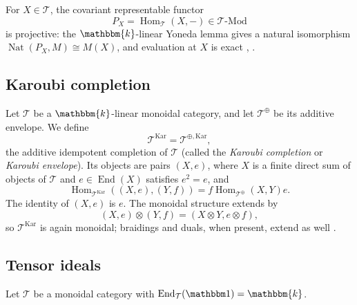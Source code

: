 \documentclass[11pt,a4paper]{amsart}
\theoremstyle{plain}%
\theoremstyle{definition}
\theoremstyle{remark}
\newcommand{\Hom}{\operatorname{Hom}}
\newcommand{\triv}{{\mathbbm 1}}
\newcommand{\End}{\operatorname{End}}
\newcommand{\kk}{\mathbbm{k}}
\newcommand{\Kar}{\mathrm{Kar}}
\begin{document}
For $X\in\mathcal{T}$, the covariant representable functor
\[
P_X=\Hom_{\mathcal{T}}(X,-)\in \mathcal{T}\text{-}\mathrm{Mod}
\]
is projective: the $\kk$-linear Yoneda lemma gives a natural isomorphism $\operatorname{Nat}(P_X,M)\cong M(X)$, and evaluation at $X$ is exact \cite[Chapters II, \S4 and III, \S2]{MacLane}, \cite[\S1.3.3--1.3.4]{Coulembier-ideals}.



\subsection{Karoubi completion}

Let $\mathcal{T}$ be a $\kk$-linear monoidal category, and let $\mathcal{T}^{\oplus}$ be its additive envelope. We define
\[
\mathcal{T}^{\Kar}=\mathcal{T}^{\oplus, \Kar},
\]
the additive idempotent completion of $\mathcal{T}$ (called the \emph{Karoubi completion} or \emph{Karoubi envelope}).  Its objects are pairs $(X,e)$, where $X$ is a finite direct sum of objects of $\mathcal{T}$ and $e\in\End(X)$ satisfies $e^2=e$, and \[\Hom_{\mathcal{T}^{\Kar}}((X,e),(Y,f))=f\Hom_{\mathcal{T}^{\oplus}}(X,Y)e. \]
The identity of $(X,e)$ is $e$. The monoidal structure extends by
\[ (X,e)\otimes(Y,f)=(X\otimes Y,e\otimes f), \] so $\mathcal{T}^{\Kar}$ is again monoidal; braidings and duals, when present, extend as well \cite[\S2.6]{Coulembier-ideals} \cite[Lemme 1.3.10]{Andre-Kahn}.


\subsection{Tensor ideals}

Let $\mathcal{T}$ be a monoidal category with $\End_{\mathcal{T}}(\triv)=\kk$.
\end{document}
